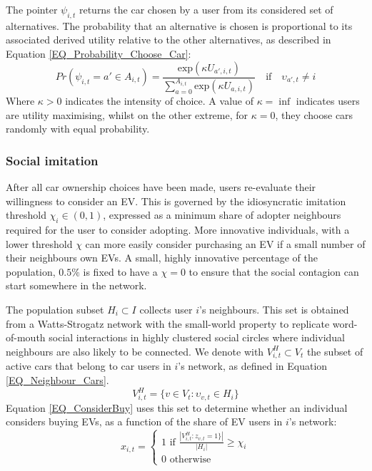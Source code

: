 \documentclass[12pt]{article}
\begin{document}
	The pointer $\psi_{i,t}$ returns the car chosen by a user from its considered set of alternatives. The probability that an alternative is chosen is proportional to its associated derived utility relative to the other alternatives, as described in Equation \ref{EQ_Probability_Choose_Car}:
	\begin{equation}
		Pr(\psi_{i,t}=a'\in{A_{i,t}}) =
		\frac{ \text{exp}(\kappa U_{a',i,t})}{\sum_{a=0}^{A_{i,t}} \text{exp}(\kappa U_{a,i,t})}\quad\text{if}\quad\upsilon_{a',t}\neq{i}
		\label{EQ_Probability_Choose_Car}
	\end{equation}
	Where $\kappa>0$ indicates the intensity of choice. A value of $\kappa = \inf$ indicates users are utility maximising, whilst on the other extreme, for $\kappa = 0$, they choose cars randomly with equal probability. \\
	
	\subsubsection{Social imitation} \label{Users_SocialImitation}
	After all car ownership choices have been made, users re-evaluate their willingness to consider an EV. This is governed by the idiosyncratic imitation threshold $\chi_i\in(0,1)$, expressed as a minimum share of adopter neighbours required for the user to consider adopting. More innovative individuals, with a lower threshold $\chi$ can more easily consider purchasing an EV if a small number of their neighbours own EVs. A small, highly innovative percentage of the population, $0.5\%$ is fixed to have a $\chi = 0$ to ensure that the social contagion can start somewhere in the network. 
    
    The population subset $H_i\subset{I}$ collects user $i$'s neighbours. This set is obtained from a Watts-Strogatz network with the small-world property to replicate word-of-mouth social interactions in highly clustered social circles where individual neighbours are also likely to be connected. We denote with $V^H_{i,t}\subset{V_t}$ the subset of active cars that belong to car users in $i$'s network, as defined in Equation \ref{EQ_Neighbour_Cars}. 
	\begin{equation}
		V^H_{i,t} = \{v \in V_t : \upsilon_{v,t} \in H_i\}
		\label{EQ_Neighbour_Cars}
	\end{equation}
	Equation \ref{EQ_ConsiderBuy} uses this set to determine whether an individual considers buying EVs, as a function of the share of EV users in $i$'s network: 
	\begin{equation}
		x_{i,t} = \begin{cases}
			1\text{ if }\frac{|V^H_{i,t}:z_{v,t}=1\}|}{|H_i|}\geq \chi_{i}\\
			0\text{ otherwise}
		\end{cases}
		\label{EQ_ConsiderBuy}
	\end{equation}
	
\end{document}
